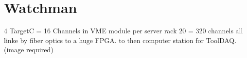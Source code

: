 \clearpage
\section{Watchman}

4 TargetC = 16 Channels in VME module per server rack 20 = 320 channels all linke by fiber optics to a huge FPGA. to then computer station for ToolDAQ. (image required)
